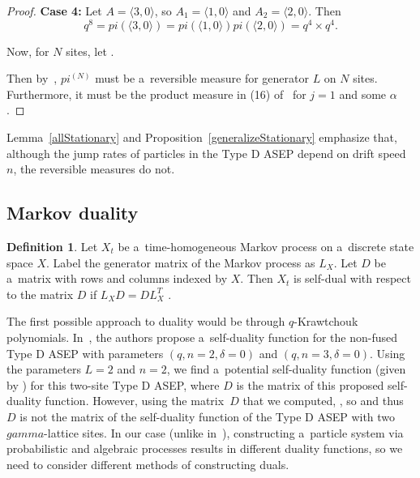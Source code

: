 \documentclass[10pt,a4paper]{amsart}
\numberwithin{equation}{section}
\theoremstyle{definition}
\newtheorem{Definition}[Theorem]{Definition}
\def\mathcal#1{#1}
\def\mathsf#1{#1}
\def\pi{pi}
\def\gamma{gamma}
\begin{document}
\begin{proof}
\textbf{Case 4:} Let $A = \langle 3,0\rangle$, so $A_1 = \langle 1,0\rangle$ and $A_2 = \langle 2,0 \rangle$. Then
\[q^8 = \pi(\langle 3,0\rangle) = \pi(\langle 1,0\rangle) \pi(\langle 2,0 \rangle) = q^4 \times q^4.\]

Now, for $N$ sites, let \smash{$\pi^{(N)}(\langle a_1, \dots, a_N \rangle) = \prod_{i < j} \pi(\langle a_i, a_j \rangle)$}.

Then by~\cite[Theorem 2.1]{kuan2024qexchangeablemeasurestransformationsinteracting}, $\pi^{(N)}$ must be a~reversible measure for generator $L$ on $N$ sites. Furthermore, it must be the product measure in (16) of~\cite{Carinci2014} for $j = 1$ and some $\alpha$.
\end{proof}

Lemma~\ref{allStationary} and Proposition~\ref{generalizeStationary} emphasize that, although the jump rates of particles in the Type D ASEP depend on drift speed $n$, the reversible measures do not.

\subsection{Markov duality}\label{subsection--MarkovDuality}

\begin{Definition}
Let $X_t$ be a~time-homogeneous Markov process on a~discrete state space $\mathcal{X}$. Label the generator matrix of the Markov process as $L_X$. Let $D$ be a~matrix with rows and columns indexed by $\mathcal{X}$. Then $X_t$ is self-dual with respect to the matrix $D$ if $L_X D = D L_X^{\mathsf{T}}$
\cite{10.1214/aop/1176990628}.
\end{Definition}

The first possible approach to duality would be through $q$-Krawtchouk polynomials. In~\cite[Theorem 3.1]{Blyschak_2023}, the authors propose a~self-duality function for the non-fused Type D ASEP with parameters $(q, n = 2, \delta = 0)$ and $(q, n = 3, \delta = 0)$. Using the parameters $L = 2$ and $n = 2$, we find a~potential self-duality function (given by \cite[Theorem~3.1]{Blyschak_2023}) for this two-site Type D ASEP, where $D$ is the matrix of this proposed self-duality function. However, using the matrix~$D$ that we computed, \smash{$L_Q^D D[1,2] \neq D\bigl(L_Q^D\bigr)^{\mathsf{T}}[1,2]$}, so \smash{$L_Q^D D \neq D\bigl(L_Q^D\bigr)^{\mathsf{T}}$} and thus $D$ is not the matrix of the self-duality function of the Type D ASEP with two $\gamma$-lattice sites. In our case (unlike in~\cite{Blyschak_2023}),
constructing a~particle system via probabilistic and algebraic processes results in different duality functions, so we need to consider different methods of constructing duals.
\end{document}
